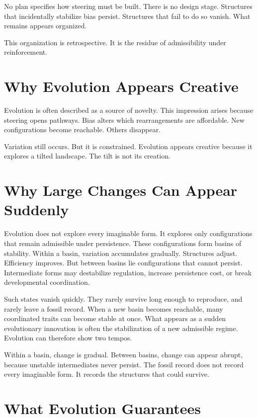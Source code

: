 \documentclass[11pt,twoside,openright]{book}
\begin{document}
No plan specifies how steering must be built. There is no design stage. Structures that incidentally stabilize bias persist. Structures that fail to do so vanish. What remains appears organized.

This organization is retrospective. It is the residue of admissibility under reinforcement.

\section*{Why Evolution Appears Creative}

Evolution is often described as a source of novelty. This impression arises because steering opens pathways. Bias alters which rearrangements are affordable. New configurations become reachable. Others disappear.

Variation still occurs. But it is constrained. Evolution appears creative because it explores a tilted landscape. The tilt is not its creation.

\section*{Why Large Changes Can Appear Suddenly}

Evolution does not explore every imaginable form. It explores only configurations that remain admissible under persistence. These configurations form basins of stability. Within a basin, variation accumulates gradually. Structures adjust. Efficiency improves. But between basins lie configurations that cannot persist. Intermediate forms may destabilize regulation, increase persistence cost, or break developmental coordination.

Such states vanish quickly. They rarely survive long enough to reproduce, and rarely leave a fossil record. When a new basin becomes reachable, many coordinated traits can become stable at once. What appears as a sudden evolutionary innovation is often the stabilization of a new admissible regime. Evolution can therefore show two tempos.

Within a basin, change is gradual. Between basins, change can appear abrupt, because unstable intermediates never persist. The fossil record does not record every imaginable form. It records the structures that could survive.

\section*{What Evolution Guarantees}
\end{document}
